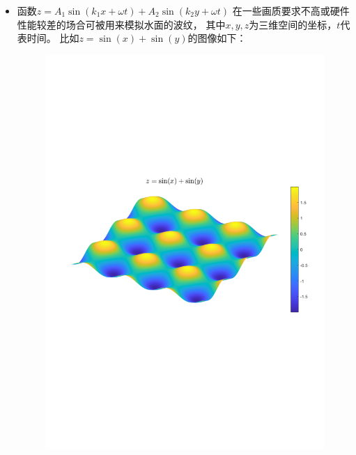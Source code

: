 \begin{itemize}[leftmargin=\inteval{\myitemleftmargin}pt,itemsep=
   \inteval{\myitemitempsep}pt,topsep=\inteval{\myitemtopsep}pt]
\item 函数$z=A_1\sin(k_1x+\omega t)+A_2\sin(k_2y+\omega t)$
在一些画质要求不高或硬件性能较差的场合可被用来模拟水面的波纹，
其中$x,y,z$为三维空间的坐标，$t$代表时间。
比如$ z=\sin(x)+\sin(y) $的图像如下：
\begin{figure}[H]
    \centering
    \includegraphics[width=0.7\linewidth]{PDF_Picture/曲面z=sinx+siny}
\end{figure}

\end{itemize}


